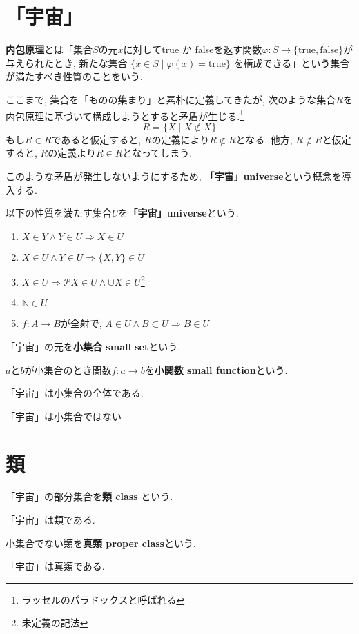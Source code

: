 \section{「宇宙」}
{\bf 内包原理}とは「集合$S$の元$x$に対してtrue か falseを返す関数$\varphi:S\rightarrow\{\mathrm{true},\mathrm{false}\}$が与えられたとき, 新たな集合
$
\{x\in S\mid\varphi(x)=\mathrm{true}\}
$
を構成できる」という集合が満たすべき性質のことをいう. 

ここまで, 集合を「ものの集まり」と素朴に定義してきたが, 次のような集合$R$を内包原理に基づいて構成しようとすると矛盾が生じる.\footnote{ラッセルのパラドックスと呼ばれる}
\[
R=\{X\mid X\notin X\}
\]
もし$R\in R$であると仮定すると, $R$の定義により$R\notin R$となる.
他方, $R\notin R$と仮定すると, $R$の定義より$R\in R$となってしまう.

このような矛盾が発生しないようにするため, {\bf 「宇宙」universe}という概念を導入する.
\begin{Def}
以下の性質を満たす集合$U$を{\bf 「宇宙」universe}という.
\begin{enumerate}
\item $X\in Y\land Y\in U\Rightarrow X\in U$
\item $X\in U\land Y\in U\Rightarrow\{X,Y\}\in U$
\item $X\in U\Rightarrow \mathscr{P}X\in U\land \cup X\in U$\footnote{未定義の記法}
\item $\mathbb{N}\in U$
\item $f:A\rightarrow B$が全射で, $A\in U\land B\subset U\Rightarrow B \in U$
\end{enumerate}
\end{Def}
\begin{Def}
「宇宙」の元を{\bf 小集合 small set}という.
\end{Def}
\begin{Def}
$a$と$b$が小集合のとき関数$f:a\rightarrow b$を{\bf 小関数 small function}という.
\end{Def}

\begin{caution}
「宇宙」は小集合の全体である.
\end{caution}
\begin{Prop}
「宇宙」は小集合ではない
\end{Prop}
\section{類}
\begin{Def}
「宇宙」の部分集合を{\bf 類 class} という.
\end{Def}
\begin{Prop}
「宇宙」は類である.
\end{Prop}

\begin{Def}
小集合でない類を{\bf 真類 proper class}という.
\end{Def}
\begin{Prop}
「宇宙」は真類である.
\end{Prop}